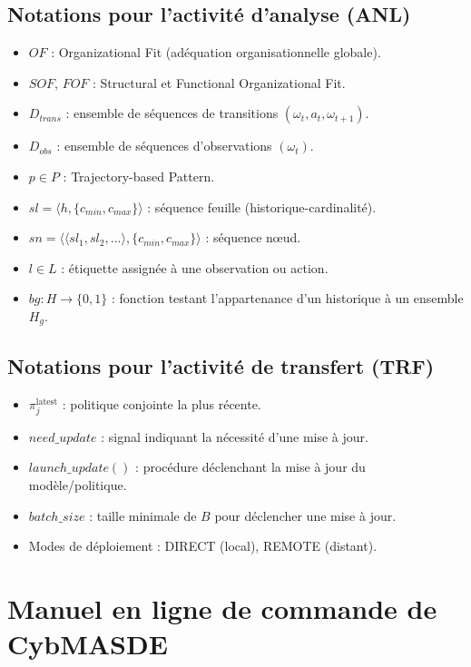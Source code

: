 \section{Notations pour l’activité d’analyse (ANL)}

\begin{itemize}
  \item $OF$ : Organizational Fit (adéquation organisationnelle globale).
  \item $SOF$, $FOF$ : Structural et Functional Organizational Fit.
  \item $D_{trans}$ : ensemble de séquences de transitions $(\omega_t, a_t, \omega_{t+1})$.
  \item $D_{obs}$ : ensemble de séquences d’observations $(\omega_t)$.
  \item $p \in P$ : Trajectory-based Pattern.
  \item $sl = \langle h, \{c_{min},c_{max}\}\rangle$ : séquence feuille (historique-cardinalité).
  \item $sn = \langle \langle sl_1, sl_2, ...\rangle, \{c_{min},c_{max}\}\rangle$ : séquence nœud.
  \item $l \in L$ : étiquette assignée à une observation ou action.
  \item $bg : H \to \{0,1\}$ : fonction testant l’appartenance d’un historique à un ensemble $H_g$.
\end{itemize}

\section{Notations pour l’activité de transfert (TRF)}

\begin{itemize}
  \item $\pi^{\text{latest}}_j$ : politique conjointe la plus récente.
  \item $need\_update$ : signal indiquant la nécessité d’une mise à jour.
  \item $launch\_update()$ : procédure déclenchant la mise à jour du modèle/politique.
  \item $batch\_size$ : taille minimale de $B$ pour déclencher une mise à jour.
  \item Modes de déploiement : DIRECT (local), REMOTE (distant).
\end{itemize}

\clearpage
\thispagestyle{empty}
\null
\newpage

\chapter{Manuel en ligne de commande de CybMASDE}\label{appendix:cybmasde-manual}

